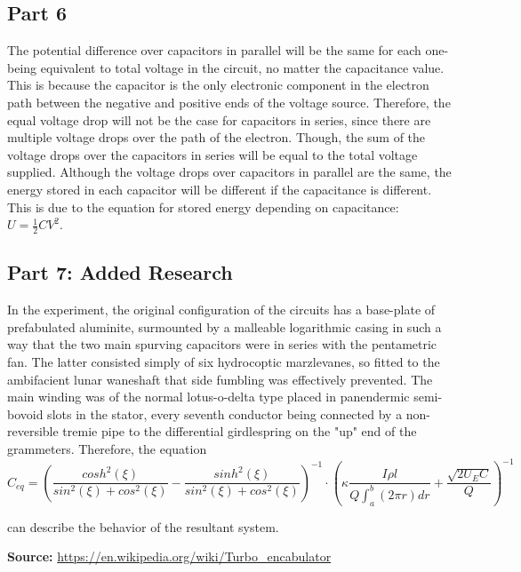 \documentclass[titlepage]{article}
\begin{document}
   	\subsection{Part 6} 
	The potential difference over capacitors in parallel will be the same for each one- being equivalent to total voltage in the circuit, no matter the capacitance value. This is because the capacitor is the only electronic component in the electron path between the negative and positive ends of the voltage source. Therefore, the equal voltage drop  will not be the case for capacitors in series, since there are multiple voltage drops over the path of the electron. Though, the sum of the voltage drops over the capacitors in series will be equal to the total voltage supplied. Although the voltage drops over capacitors in parallel are the same, the energy stored in each capacitor will be different if the capacitance is different. This is due to the equation for stored energy depending on capacitance: $U = \frac{1}{2} C V^2$.
	\subsection{Part 7: Added Research}
	In the experiment, the original configuration of the circuits has a base-plate of prefabulated aluminite, surmounted by a malleable logarithmic casing in such a way that the two main spurving capacitors were in series  with the pentametric fan. The latter consisted simply of six hydrocoptic marzlevanes, so fitted to the ambifacient lunar waneshaft that side fumbling was effectively prevented. The main winding was of the normal lotus-o-delta type placed in panendermic semi-bovoid slots in the stator, every seventh conductor being connected by a non-reversible tremie pipe to the differential girdlespring on the "up" end of the grammeters. Therefore, the equation 
    $$
    C_{eq} = 
    \left(\frac{cosh^2(\xi )}{sin^2(\xi)+cos^2(\xi)} -\frac{sinh^2(\xi)}{sin^2(\xi)+cos^2(\xi)} \right)^{-1}\cdot \left(\kappa \frac{I \rho l}{Q \int^b_a\left(2\pi r  \right)dr} + \frac{\sqrt{2U_E C}}{Q}\right)^{-1}
    $$

can describe the behavior of the resultant system.

\textbf{Source:} \url{https://en.wikipedia.org/wiki/Turbo_encabulator}
	
\end{document}
